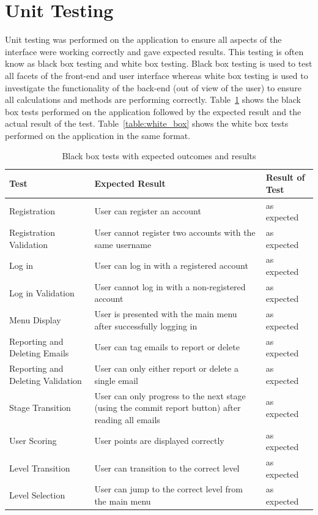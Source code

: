 \documentclass{l4proj}
\begin{document}
\section{Unit Testing}
Unit testing was performed on the application to ensure all aspects of the interface were working correctly and gave expected results. This testing is often know as black box testing and white box testing. Black box testing is used to test all facets of the front-end and user interface whereas white box testing is used to investigate the functionality of the back-end (out of view of the user) to ensure all calculations and methods are performing correctly. Table~\ref{table:black_box} shows the black box tests performed on the application followed by the expected result and the actual result of the test. Table~\ref{table:white_box} shows the white box tests performed on the application in the same format.
\begin{table}[H]
\begin{tabular}{ | m{10em} | m{20em}| m{10em} | } 
  \hline
  \textbf{Test} & \textbf{Expected Result} & \textbf{Result of Test} \\ 
  \hline
  Registration & User can register an account & as expected \\ 
  \hline
  Registration Validation & User cannot register two accounts with the same username & as expected \\ 
  \hline
  Log in & User can log in with a registered account & as expected \\ 
  \hline
  Log in Validation & User cannot log in with a non-registered account & as expected \\ 
  \hline
  Menu Display & User is presented with the main menu after successfully logging in & as expected \\ 
  \hline
  Reporting and Deleting Emails & User can tag emails to report or delete & as expected \\ 
  \hline
  Reporting and Deleting Validation & User can only either report or delete a single email & as expected \\ 
  \hline
  Stage Transition & User can only progress to the next stage (using the commit report button) after reading all emails & as expected \\ 
  \hline
  User Scoring & User points are displayed correctly & as expected \\ 
  \hline
  Level Transition & User can transition to the correct level & as expected \\ 
  \hline
  Level Selection & User can jump to the correct level from the main menu & as expected \\ 
  \hline
\end{tabular}
\caption{Black box tests with expected outcomes and results}
\label{table:black_box}
\end{table}
\end{document}
